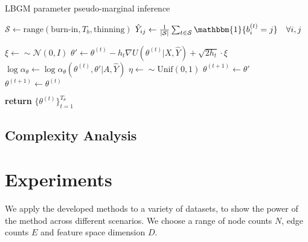 \documentclass{article}
\newcommand{\one}{\mathbbm{1}}
\newcommand{\Gaussian}{\mathcal{N}}
\begin{document}
\begin{algorithm} %
	\caption{LBGM parameter pseudo-marginal inference} %
	\label{alg:theta-samples} %
	\begin{algorithmic} %
		
		\STATE $\mathcal{S} \gets \textrm{range}(\textrm{burn-in}, T_b, \textrm{thinning})$
		\STATE $\hat{Y}_{ij} \gets \frac{1}{\mathcal{|S|}} \sum_{t \in \mathcal{S}} \one \{ b^{(t)}_i = j\} \quad \forall i,j$
		
		\item[]
		
		\STATE $\xi \gets \sim \Gaussian(0, I)$
		\STATE $\theta' \gets \theta^{(t)} - h_t \nabla U(\theta^{(t)} | X, \hat{Y}) + \sqrt{2h_t} \cdot \xi$
		\STATE $\log \alpha_\theta \gets \log \alpha_\theta(\theta^{(t)}, \theta' | A, \hat{Y})$
		\STATE $\eta \gets \sim \textrm{Unif}(0,1)$
		\IF{$\log \eta < \log \alpha_\theta$}
		\STATE $\theta^{(t+1)} \gets \theta'$
		\ELSE
		\STATE $\theta^{(t+1)} \gets \theta^{(t)}$
		\ENDIF
		\ENDFOR
		
		\STATE \textbf{return} $\{\theta^{(t)}\}_{t=1}^{T_\theta}$
		
	\end{algorithmic}
\end{algorithm}

\subsection{Complexity Analysis}

\section{Experiments}

We apply the developed methods to a variety of datasets, to show the power of the method across different scenarios. We choose a range of node counts $N$, edge counts $E$ and feature space dimension $D$.
\end{document}

